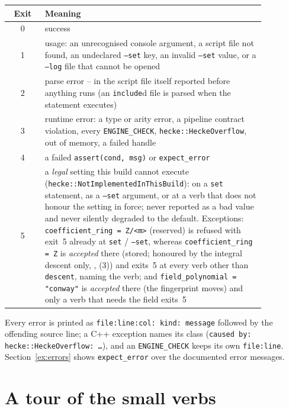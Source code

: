 \documentclass[11pt,openany]{report}
\newcommand{\cli}[1]{\texttt{#1}}
\newcommand{\vb}[1]{\texttt{#1}}
\begin{document}
\begin{center}\small
\begin{tabular}{@{}c>{\raggedright\arraybackslash}p{0.86\linewidth}@{}}
\toprule
\textbf{Exit} & \textbf{Meaning}\\\midrule
0 & success\\
1 & usage: an unrecognised console argument, a script file not found, an undeclared \cli{--set} key, an invalid \cli{--set} value, or a \cli{--log} file that cannot be opened\\
2 & parse error -- in the script file itself reported before anything runs (an \vb{include}d file is parsed when the statement executes)\\
3 & runtime error: a type or arity error, a pipeline contract violation, every \texttt{ENGINE\_CHECK}, \texttt{hecke::HeckeOverflow}, out of memory, a failed handle\\
4 & a failed \vb{assert(cond, msg)} or \vb{expect\_error}\\
5 & a \emph{legal} setting this build cannot execute (\texttt{hecke::NotImplementedInThisBuild}): on a \texttt{set} statement, as a \cli{--set} argument, or at a verb that does not honour the setting in force; never reported as a bad value and never silently degraded to the default. Exceptions: \texttt{coefficient\_ring = Z/<m>} (reserved) is refused with exit~5 already at \texttt{set} / \cli{--set}, whereas \texttt{coefficient\_ring = Z} is \emph{accepted} there (stored; honoured by the integral descent only, {}, {}(3)) and exits~5 at every verb other than \vb{descent}, naming the verb; and \texttt{field\_polynomial = "conway"} is \emph{accepted} there (the fingerprint moves) and only a verb that needs the field exits~5\\
\bottomrule
\end{tabular}
\end{center}
Every error is printed as \texttt{file:line:col: kind: message} followed by the offending source line; a
C++ exception names its class (\texttt{caused by: hecke::HeckeOverflow: \dots}), and an
\texttt{ENGINE\_CHECK} keeps its own \texttt{file:line}. Section~\ref{ex:errors} shows
\vb{expect\_error} over the documented error messages.

\section{A tour of the small verbs}\label{sec:tour}
\end{document}
